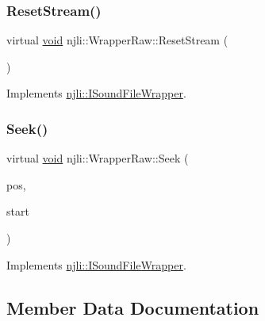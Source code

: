 \mbox{\label{classnjli_1_1_wrapper_raw_ab48755f1c7d217737288bfe4c6320c16}} 
\subsubsection{\texorpdfstring{Reset\+Stream()}{ResetStream()}}
{\footnotesize\ttfamily virtual \mbox{\hyperlink{_thread_8h_af1e856da2e658414cb2456cb6f7ebc66}{void}} njli\+::\+Wrapper\+Raw\+::\+Reset\+Stream (\begin{DoxyParamCaption}{ }\end{DoxyParamCaption})\hspace{0.3cm}{\ttfamily [virtual]}}



Implements \mbox{\hyperlink{classnjli_1_1_i_sound_file_wrapper_ab302d724c78a9a55f6dcb288d31e6854}{njli\+::\+I\+Sound\+File\+Wrapper}}.

\mbox{\label{classnjli_1_1_wrapper_raw_a9ffac2e6ec0dca3b9592fba9e29ba3f4}} 
\subsubsection{\texorpdfstring{Seek()}{Seek()}}
{\footnotesize\ttfamily virtual \mbox{\hyperlink{_thread_8h_af1e856da2e658414cb2456cb6f7ebc66}{void}} njli\+::\+Wrapper\+Raw\+::\+Seek (\begin{DoxyParamCaption}\item[{size\+\_\+t}]{pos,  }\item[{\mbox{\hyperlink{classnjli_1_1_i_sound_file_wrapper_ab4b07720cb2823b4f3f9fa98ee07a6e7}{S\+E\+E\+K\+\_\+\+P\+OS}}}]{start }\end{DoxyParamCaption})\hspace{0.3cm}{\ttfamily [virtual]}}



Implements \mbox{\hyperlink{classnjli_1_1_i_sound_file_wrapper_a22241a77b7d6adf55045a7a30ec5ef30}{njli\+::\+I\+Sound\+File\+Wrapper}}.



\subsection{Member Data Documentation}
\mbox{\label{classnjli_1_1_wrapper_raw_a3ab92988abb19e2d2c7ec7adf6766829}} 
